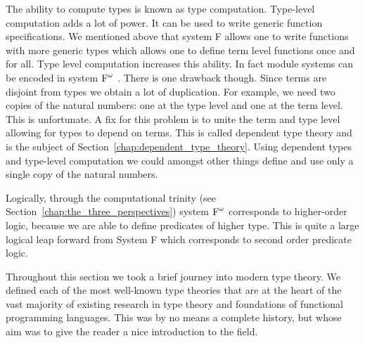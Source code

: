 The ability to compute types is known as type
computation.  Type-level
computation adds a lot of power.  It can be used to write generic
function specifications.  We mentioned above that system F allows one
to write functions with more generic types which allows one to define
term level functions once and for all.  Type level computation
increases this ability.  In fact module systems can be encoded in
system $\text{F}^\omega$ \cite{Shan:2006}.  There is one drawback though.  Since
terms are disjoint from types we obtain a lot of duplication.  For
example, we need two copies of the natural numbers: one at the type
level and one at the term level.  This is unfortunate.  A fix for this
problem is to unite the term and type level allowing for types to
depend on terms.  This is called dependent type theory and is the
subject of Section~\ref{chap:dependent_type_theory}.  Using dependent
types and type-level computation we could amongst other things define
and use only a single copy of the natural numbers.

Logically, through the computational trinity (see
Section~\ref{chap:the_three_perspectives}) system $\text{F}^\omega$ corresponds to
higher-order logic, because we are able to define predicates of higher
type.  This is quite a large logical leap forward from System F which
corresponds to second order predicate logic.

Throughout this section we took a brief journey into modern type
theory.  We defined each of the most well-known type theories that
are at the heart of the vast majority of existing research in type
theory and foundations of functional programming languages.  This was
by no means a complete history, but whose aim was to give the reader a
nice introduction to the field.
